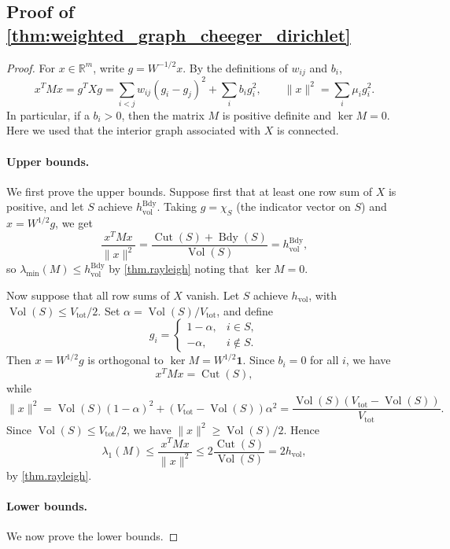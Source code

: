 \documentclass{article}
\newcommand{\one}{\mathbf{1}}
\begin{document}
\subsection{Proof of \cref{thm:weighted_graph_cheeger_dirichlet} }
\label{sec.app.proof.dirichlet}
\begin{proof}
For \(x\in\mathbb R^m\), write \(g=W^{-1/2}x\). By the definitions of \(w_{ij}\) and \(b_i\),
\[
x^TMx=g^TXg=\sum_{i<j}w_{ij}(g_i-g_j)^2+\sum_i b_i g_i^2,\qquad \|x\|^2=\sum_i\mu_i g_i^2.
\]
In particular, if a $b_i>0$, then the matrix $M$ is positive definite and $\ker M =0$. Here we used that the interior graph associated with \(X\) is connected.
\paragraph{Upper bounds.}
We first prove the upper bounds. Suppose first that at least one row sum of \(X\) is positive, and let \(S\) achieve \(h_{\mathrm{vol}}^{\mathrm{Bdy}}\). Taking \(g=\chi_S\) (the indicator vector on $S$) and \(x=W^{1/2}g\), we get
\[
\frac{x^TMx}{\|x\|^2}
=
\frac{\operatorname{Cut}(S)+\operatorname{Bdy}(S)}{\operatorname{Vol}(S)}
=
h_{\mathrm{vol}}^{\mathrm{Bdy}},
\]
so \(\lambda_{\min}(M)\leq h_{\mathrm{vol}}^{\mathrm{Bdy}}\) by \cref{thm.rayleigh} noting that $\ker M =0$.



Now suppose that all row sums of \(X\) vanish. Let \(S\) achieve \(h_{\mathrm{vol}}\), with \(\operatorname{Vol}(S)\leq V_{\mathrm{tot}}/2\). Set \(\alpha=\operatorname{Vol}(S)/V_{\mathrm{tot}}\), and define
\[
g_i=
\begin{cases}
1-\alpha, & i\in S,\\
-\alpha, & i\notin S.
\end{cases}
\]
Then \(x=W^{1/2}g\) is orthogonal to \(\ker M = W^{1/2}\one\). Since \(b_i=0\) for all \(i\), we have
\[
x^TMx=\operatorname{Cut}(S),
\]
while
\[
\|x\|^2=\operatorname{Vol}(S)(1-\alpha)^2+(V_{\mathrm{tot}}-\operatorname{Vol}(S))\alpha^2
=\frac{\operatorname{Vol}(S)(V_{\mathrm{tot}}-\operatorname{Vol}(S))}{V_{\mathrm{tot}}}.
\]
Since \(\operatorname{Vol}(S)\leq V_{\mathrm{tot}}/2\), we have \(\|x\|^2\geq \operatorname{Vol}(S)/2\). Hence
\[
\lambda_1(M)\leq \frac{x^TMx}{\|x\|^2}\leq 2\frac{\operatorname{Cut}(S)}{\operatorname{Vol}(S)}=2h_{\mathrm{vol}},
\]
by \cref{thm.rayleigh}.
\paragraph{Lower bounds.}
We now prove the lower bounds.


\end{proof}
\end{document}
